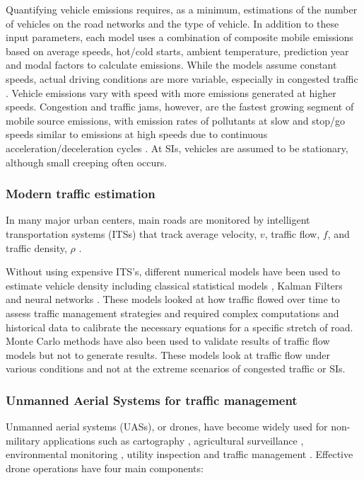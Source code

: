 \documentclass[preprint,12pt,a4paper]{elsarticle}
\begin{document}
\begin{linenumbers}
Quantifying vehicle emissions requires, as a minimum, estimations of the number of vehicles on the road networks and the type of vehicle. In addition to these input parameters, each model uses a combination of composite mobile emissions based on average speeds, hot/cold starts, ambient temperature, prediction year and modal factors to calculate emissions\citep{Franco2013}. While the models assume constant speeds, actual driving conditions are more variable, especially in congested traffic \citep{Freeman2015b}. Vehicle emissions vary with speed with more emissions generated at higher speeds. Congestion and traffic jams, however, are the fastest growing segment of mobile source emissions, with emission rates of pollutants at slow and stop/go speeds similar to emissions at high speeds due to continuous acceleration/deceleration cycles \citep{Barth2009}. At SIs, vehicles are assumed to be stationary, although small creeping often occurs.

\subsubsection{Modern traffic estimation}

In many major urban centers, main roads are monitored by intelligent transportation systems (ITSs) that track average velocity, $v$, traffic flow, $f$, and traffic density, $\rho$ \citep{Wu2007, Abtahi2011, Bartosz2015}.

Without using expensive ITS's, different numerical models have been used to estimate vehicle density including classical statistical models \citep{Schreckenberg1995}, Kalman Filters \citep{Pourmoallem1997, Sun2004} and neural networks \citep{Ghosh-Dastidar2006}.  These models looked at how traffic flowed over time to assess traffic management strategies and required complex computations and historical data to calibrate the necessary equations for a specific stretch of road.  Monte Carlo methods have also been used to validate results of traffic flow models \citep{Mihaylova2004} but not to generate results.  These models look at traffic flow under various conditions and not at the extreme scenarios of congested traffic or SIs. 

\subsubsection{Unmanned Aerial Systems for traffic management} 
Unmanned aerial systems (UASs), or drones, have become widely used for non-military applications such as cartography \citep{Saadatseresht2015}, agricultural surveillance \citep{Saari2017}, environmental monitoring \citep{Capolupo2015, Rees2018}, utility inspection \citep{Day2017, Gomez2017} and traffic management \citep{Ahmadi2017,  Salvo2017, Liu2013}.  Effective drone operations have four main components:


\end{linenumbers}
\end{document}
